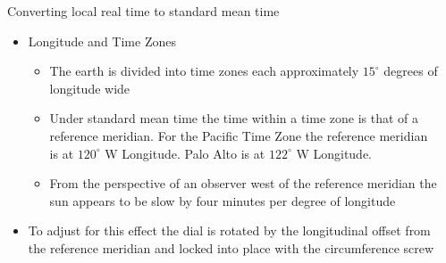 \documentclass[final]{beamer}
\begin{document}
\begin{frame}
\begin{columns}[t]
\begin{column}[t]{0.24 \textwidth}
\end{column}
\begin{column}[t]{0.24 \textwidth}
\alert{Converting local real time to standard mean time}
\begin{itemize}
\item Longitude and Time Zones\\
\begin{itemize}
\item The earth is divided into time zones each approximately $15 ^\circ$ degrees of 
longitude wide
\item Under standard mean time the time within a time zone is that of a reference meridian. 
For the Pacific Time Zone the reference meridian is at $120^\circ$ W Longitude. Palo 
Alto is at $122^\circ$ W Longitude.
\item From the perspective of an observer west of the reference meridian the 
sun appears to be slow by four minutes per degree of longitude
\begin{center}
\end{center}
\end{itemize}
\item To adjust for this effect the dial is rotated by the longitudinal offset from
the reference meridian and locked into place with the circumference screw
\begin{center}

\end{center}
\end{itemize}
\end{column}
\end{columns}
\end{frame}
\end{document}
